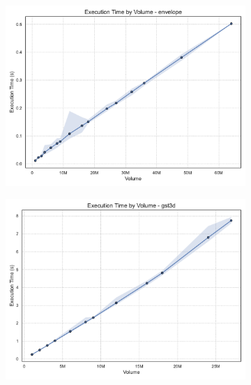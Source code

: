 \begin{figure}[htbp]
    \centering
    \begin{subfigure}[t]{0.49\textwidth}
        \includegraphics[width=\textwidth]{assets/images/05/execution_time_by_volume_envelope}
    \end{subfigure}
    \hfill
    \begin{subfigure}[t]{0.49\textwidth}
        \centering
        \includegraphics[width=\textwidth]{assets/images/05/execution_time_by_volume_gst3d}
    \end{subfigure}
    \hfill
    \begin{subfigure}[t]{0.49\textwidth}
        \centering

\end{subfigure}
\end{figure}

